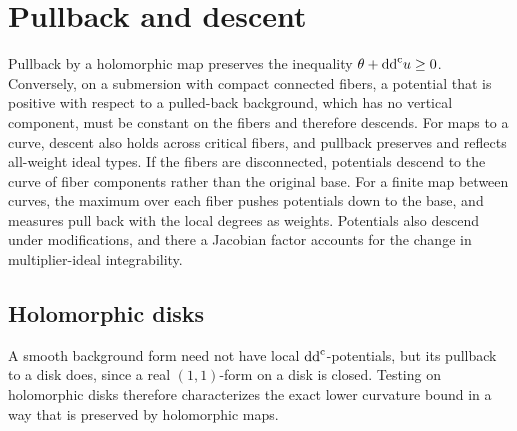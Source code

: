 \section{Pullback and descent}
\label{sec:psh-descent}

Pullback by a holomorphic map preserves the inequality $\theta+\mathrm{dd}^{\mathrm{c}} u\geq0$. Conversely, on a submersion with compact connected fibers, a potential that is positive with respect to a pulled-back background, which has no vertical component, must be constant on the fibers and therefore descends. For maps to a curve, descent also holds across critical fibers, and pullback preserves and reflects all-weight ideal types. If the fibers are disconnected, potentials descend to the curve of fiber components rather than the original base. For a finite map between curves, the maximum over each fiber pushes potentials down to the base, and measures pull back with the local degrees as weights. Potentials also descend under modifications, and there a Jacobian factor accounts for the change in multiplier-ideal integrability.

\subsection{Holomorphic disks}

A smooth background form need not have local $\mathrm{dd}^{\mathrm{c}}$-potentials, but its pullback to a disk does, since a real $(1,1)$-form on a disk is closed. Testing on holomorphic disks therefore characterizes the exact lower curvature bound in a way that is preserved by holomorphic maps.

